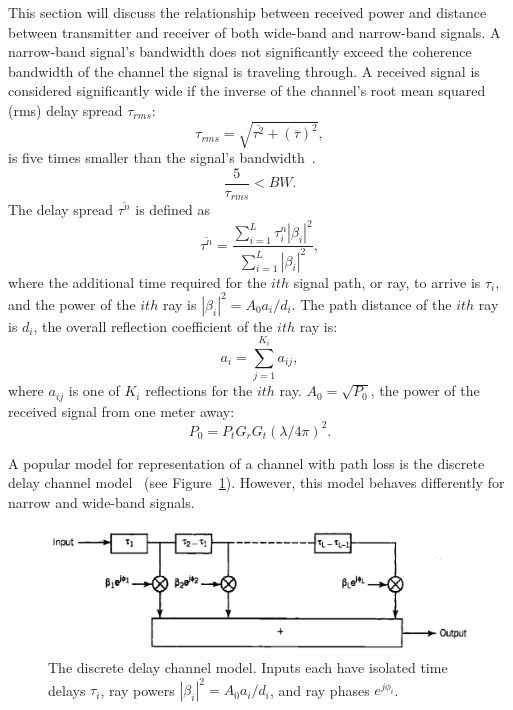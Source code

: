 This section will discuss the relationship between received power and distance between transmitter and receiver of both wide-band and narrow-band signals. A narrow-band signal's bandwidth does not significantly exceed the coherence bandwidth of the channel the signal is traveling through. A received signal is considered significantly wide if the inverse of the channel's root mean squared (rms) delay spread $\tau_{rms}$:
\begin{equation}
\label{eq:trms}
\tau_{rms} = \sqrt{\overline{\tau^2}+(\overline{\tau})^2},
\end{equation}
is five times smaller than the signal's bandwidth~\cite{pahlavan2005wireless}.
\begin{equation}
\label{eq:cohbw}
\frac{5}{\tau_{rms}} < BW.
\end{equation}
The delay spread $\overline{\tau^n}$ is defined as
\begin{equation}
\label{eq:tau}
\overline{\tau^n} = \frac{\sum_{i=1}^L \tau_i^n |\beta_i|^2}{\sum_{i=1}^L |\beta_i|^2},
\end{equation}
where the additional time required for the $ith$ signal path, or ray, to arrive is $\tau_i$, and the power of the $ith$ ray is $|\beta_i|^2=A_0 a_i/d_i$. The path distance of the $ith$ ray is $d_i$, the overall reflection coefficient of the $ith$ ray is:
\begin{equation}
\label{eq:coeff}
a_i = \sum_{j=1}^{K_i} a_{ij},
\end{equation}
where $a_{ij}$ is one of $K_i$ reflections for the $ith$ ray. $A_0 = \sqrt{P_0}$, the power of the received signal from one meter away:
\begin{equation}
\label{eq:po}
P_0 = P_tG_rG_t(\lambda/4\pi)^2.
\end{equation}

A popular model for representation of a channel with path loss is the discrete delay channel model~\cite{pahlavan2005wireless} (see Figure~\ref{fig:discdelay}). However, this model behaves differently for narrow and wide-band signals.
\begin{figure}[ht!]
	\centering	\includegraphics[width=1\textwidth,keepaspectratio]{figs/discdelaychannel.png}
    \caption{The discrete delay channel model. Inputs each have isolated time delays $\tau_i$, ray powers $|\beta_i|^2=A_0 a_i/d_i$, and ray phases $e^{j\phi_i}$.} 
\label{fig:discdelay}      
\end{figure}

